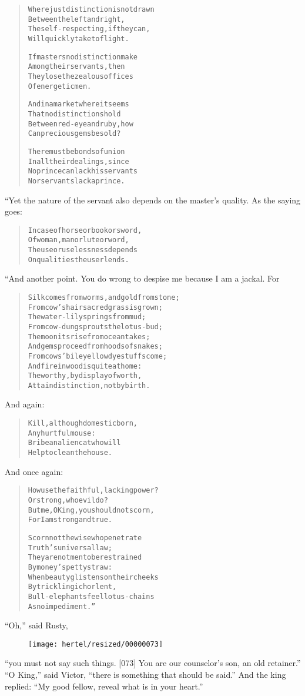 \documentclass[article, twoside, 10pt]{memoir}
\renewenvironment{verbatim}{%
\begin{quote}%
\vskip -10pt%
\begin{alltt}\normalfont\small}{\end{alltt}%
\end{quote}%
\vskip -10pt
} %
\begin{document}
\begin{verbatim}
Where just distinction is not drawn
    Between the left and right,
The self-respecting, if they can,
    Will quickly take to flight.

If masters no distinction make
    Among their servants, then
They lose the zealous offices
    Of energetic men.

And in a market where it seems
    That no distinctions hold
Between red-eye and ruby, how
    Can precious gems be sold?

There must be bonds of union
    In all their dealings, since
No prince can lack his servants
    Nor servants lack a prince.
\end{verbatim}
“Yet the nature of the servant also depends on the master's
quality. As the saying goes:

\begin{verbatim}
In case of horse or book or sword,
Of woman, man or lute or word,
The use or uselessness depends
On qualities the user lends.
\end{verbatim}
“And another point. You do wrong to despise me because I am a
jackal. For

\begin{verbatim}
Silk comes from worms, and gold from stone;
From cow's hair sacred grass is grown;
The water-lily springs from mud;
From cow-dung sprouts the lotus-bud;
The moon its rise from ocean takes;
And gems proceed from hoods of snakes;
From cows' bile yellow dyestuffs come;
And fire in wood is quite at home:
The worthy, by display of worth,
Attain distinction, not by birth.
\end{verbatim}
And again:

\begin{verbatim}
Kill, although domestic born,
    Any hurtful mouse:
Bribe an alien cat who will
    Help to clean the house.
\end{verbatim}
And once again:

\begin{verbatim}
How use the faithful, lacking power?
    Or strong, who evil do?
But me, O King, you should not scorn,
    For I am strong and true.

Scorn not the wise who penetrate
    Truth's universal law;
They are not men to be restrained
    By money's petty straw:
When beauty glistens on their cheeks
    By trickling ichor lent,
Bull-elephants feel lotus-chains
    As no impediment.”
\end{verbatim}
``Oh,'' said Rusty,
\begin{figure}[p]\texttt{[image: hertel/resized/00000073]}\end{figure}``you must not say such things. [073] You are our counselor's son, an old retainer.''
``O King,'' said Victor,
``there is something that should be said.'' And the king replied:
``My good fellow, reveal what is in your heart.''
\end{document}
